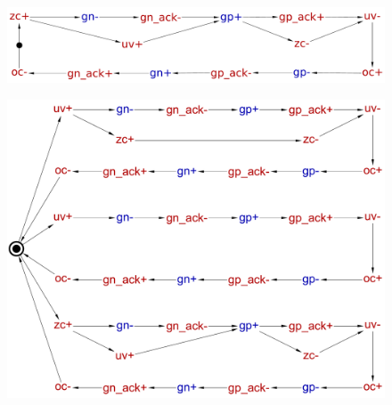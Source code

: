\documentclass[british, journal]{IEEEtran}
\begin{document}
\begin{figure}[H]
	\begin{centering}
		\includegraphics[scale=0.23]{Images/stg-UV_after_ZC}
		\par\end{centering}
	\vspace{-3mm}
\end{figure}

\begin{figure}[H]
	\begin{centering}
		\includegraphics[scale=0.23]{Images/stg-buck-scenarios_merged}
		\par\end{centering}
	\begin{centering}
		\par\end{centering}
	\vspace{-3mm}
\end{figure}
\end{document}
